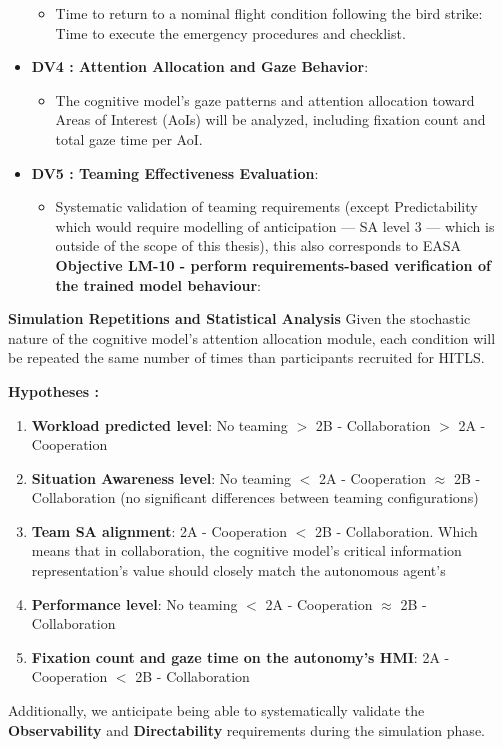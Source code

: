 \documentclass[12pt,a4paper]{article} %
\begin{document}
\begin{itemize}
		\begin{itemize}
			\item Time to return to a nominal flight condition following the bird strike: Time to execute the emergency procedures and checklist.
		\end{itemize}
		\item \textbf{DV4 : Attention Allocation and Gaze Behavior}:
		\begin{itemize}
			\item The cognitive model's gaze patterns and attention allocation toward Areas of Interest (AoIs) will be analyzed, including fixation count and total gaze time per AoI.
		\end{itemize}
		\item \textbf{DV5 : Teaming Effectiveness Evaluation}:
		\begin{itemize}
			\item Systematic validation of teaming requirements (except Predictability which would require modelling of anticipation --- SA level 3 --- which is outside of the scope of this thesis), this also corresponds to EASA \textbf{Objective LM-10 - perform requirements-based verification of the trained model behaviour}:
		\end{itemize}
	\end{itemize}
	
	\textbf{Simulation Repetitions and Statistical Analysis}
	Given the stochastic nature of the cognitive model's attention allocation module, each condition will be repeated the same number of times than participants recruited for HITLS.

	\textbf{Hypotheses :}
	\begin{enumerate}[label=\textbf{H\arabic* :}]
	\label{hypotheses}
	\item \textbf{Workload predicted level}: No teaming $>$ 2B - Collaboration $>$ 2A - Cooperation
	\item \textbf{Situation Awareness level}: No teaming $<$ 2A - Cooperation $\approx$ 2B - Collaboration (no significant differences between teaming configurations)
	\item \textbf{Team SA alignment}: 2A - Cooperation $<$ 2B - Collaboration. Which means that in collaboration, the cognitive model's critical information representation's value should closely match the autonomous agent's
	\item \textbf{Performance level}: No teaming $<$ 2A - Cooperation $\approx$ 2B - Collaboration
	\item \textbf{Fixation count and gaze time on the autonomy's HMI}: 2A - Cooperation $<$ 2B - Collaboration
	\end{enumerate}
	Additionally, we anticipate being able to systematically validate the \textbf{Observability} and \textbf{Directability} requirements during the simulation phase.
	
\end{document}
